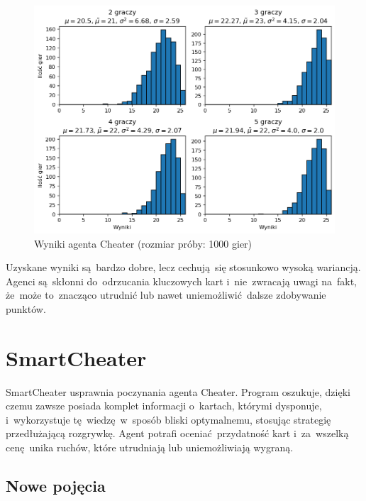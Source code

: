\documentclass[declaration,shortabstract,inz]{iithesis}
\begin{document}
\begin{figure}[H]
	\centering
	\captionsetup{format=hang}
	\includegraphics[width=\textwidth,height=\textheight,keepaspectratio]{Cheater.png}
	\caption[Caption]{Wyniki agenta Cheater (rozmiar próby: 1000 gier)}
	\label{fig:Cheater}
\end{figure}

Uzyskane wyniki są~bardzo dobre, lecz cechują~się stosunkowo wysoką wariancją. Agenci są~skłonni do~odrzucania kluczowych kart i~nie~zwracają uwagi na~fakt, że~może to~znacząco utrudnić lub nawet uniemożliwić dalsze zdobywanie punktów.

\section{SmartCheater}

SmartCheater usprawnia poczynania agenta Cheater. Program oszukuje, dzięki czemu zawsze posiada komplet informacji o~kartach, którymi dysponuje, i~wykorzystuje tę~wiedzę w~sposób bliski optymalnemu, stosując strategię przedłużającą rozgrywkę. Agent potrafi oceniać przydatność kart i~za~wszelką cenę unika ruchów, które utrudniają lub uniemożliwiają wygraną.

\subsection*{Nowe pojęcia}
\end{document}

